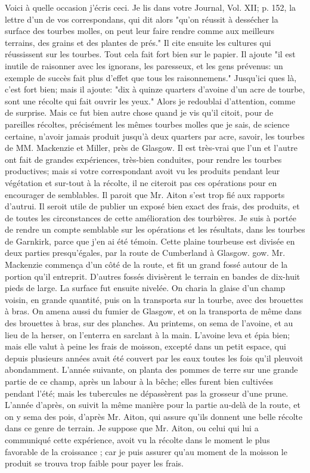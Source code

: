Voici à quelle occasion j'écris ceci. Je lis dans votre Journal, Vol. XII; p. 152, la lettre d'un de vos correspondans, qui dit alors "qu'on réussit à dessécher la surface des tourbes molles, on peut leur faire rendre comme aux meilleurs terrains, des grains et des plantes de prés." Il cite ensuite les cultures qui réussissent sur les tourbes. Tout cela fait fort bien sur le papier. Il ajoute "il est inutile de raisonner avec les ignorans, les paresseux, et les gens prévenus: un exemple de succès fait plus d'effet que tous les raisonnemens." Jusqu'ici\setcounter{page}{458} ques là, c'est fort bien; mais il ajoute: "dix à quinze quarters d'avoine d'un acre de tourbe, sont une récolte qui fait ouvrir les yeux." Alors je redoublai d'attention, comme de surprise. Mais ce fut bien autre chose quand je vis qu'il citoit, pour de pareilles récoltes, précisément les mêmes tourbes molles que je sais, de science certaine, n'avoir jamais produit jusqu'à deux quarters par acre, savoir, les tourbes de MM. Mackenzie et Miller, près de Glasgow. Il est très-vrai que l'un et l'autre ont fait de grandes expériences, très-bien conduites, pour rendre les tourbes productives; mais si votre correspondant avoit vu les produits pendant leur végétation et sur-tout à la récolte, il ne citeroit pas ces opérations pour en encourager de semblables. Il paroit que Mr. Aiton s'est trop fié aux rapports d'autrui. Il seroit utile de publier un exposé bien exact des frais, des produits, et de toutes les circonstances de cette amélioration des tourbières.
Je suis à portée de rendre un compte semblable sur les opérations et les résultats, dans les tourbes de Garnkirk, parce que j'en ai été témoin. Cette plaine tourbeuse est divisée en deux parties presqu'égales, par la route de Cumberland à Glasgow.\setcounter{page}{459} gow. Mr. Mackenzie commença d'un côté de la route, et fit un grand fossé autour de la portion qu'il entreprit. D'autres fossés divisèrent le terrain en bandes de dix-huit pieds de large. La surface fut ensuite nivelée. On charia la glaise d'un champ voisin, en grande quantité, puis on la transporta sur la tourbe, avec des brouettes à bras. On amena aussi du fumier de Glasgow, et on la transporta de même dans des brouettes à bras, sur des planches. Au printems, on sema de l'avoine, et au lieu de la herser, on l'enterra en sarclant à la main. L'avoine leva et épia bien; mais elle valut à peine les frais de moisson, excepté dans un petit espace, qui depuis plusieurs années avait été couvert par les eaux toutes les fois qu'il pleuvoit abondamment. L'année suivante, on planta des pommes de terre sur une grande partie de ce champ, après un labour à la bêche; elles furent bien cultivées pendant l'été; mais les tubercules ne dépassèrent pas la grosseur d'une prune. L'année d'après, on suivit la même manière pour la partie au-delà de la route, et on y sema des pois, d'après Mr. Aiton, qui assure qu'ils donnent une belle récolte dans ce genre de terrain. Je suppose que Mr. Aiton, ou celui qui lui a communiqué cette expérience, avoit vu la\setcounter{page}{460} récolte dans le moment le plus favorable de la croissance ; car je puis assurer qu'au moment de la moisson le produit se trouva trop faible pour payer les frais.
